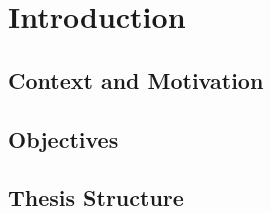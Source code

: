 
%

\chapter{Introduction}
\label{cha:introduction}

\section{Context and Motivation}
\label{sec:context}


\section{Objectives}
\label{sec:objectives}


\section{Thesis Structure}
\label{sec:structure}

